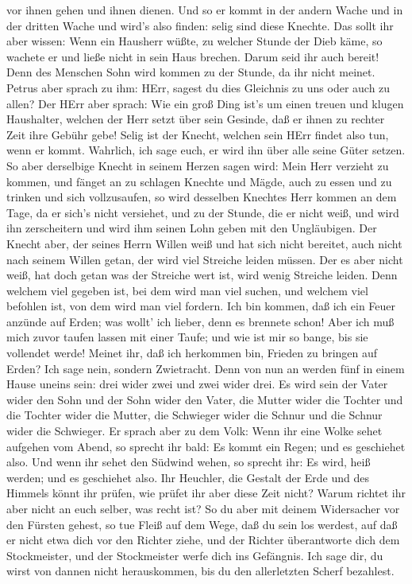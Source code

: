 vor ihnen gehen und ihnen dienen.  Und so er kommt in der
andern Wache und in der dritten Wache und wird's also finden: selig sind
diese Knechte.  Das sollt ihr aber wissen: Wenn ein
Hausherr wüßte, zu welcher Stunde der Dieb käme, so wachete er und ließe
nicht in sein Haus brechen.  Darum seid ihr auch bereit!
Denn des Menschen Sohn wird kommen zu der Stunde, da ihr nicht meinet.
 Petrus aber sprach zu ihm: HErr, sagest du dies Gleichnis
zu uns oder auch zu allen?  Der HErr aber sprach: Wie ein
groß Ding ist's um einen treuen und klugen Haushalter, welchen der Herr
setzt über sein Gesinde, daß er ihnen zu rechter Zeit ihre Gebühr gebe!
 Selig ist der Knecht, welchen sein HErr findet also tun,
wenn er kommt.  Wahrlich, ich sage euch, er wird ihn über
alle seine Güter setzen.  So aber derselbige Knecht in
seinem Herzen sagen wird: Mein Herr verzieht zu kommen, und fänget an zu
schlagen Knechte und Mägde, auch zu essen und zu trinken und sich
vollzusaufen,  so wird desselben Knechtes Herr kommen an
dem Tage, da er sich's nicht versiehet, und zu der Stunde, die er nicht
weiß, und wird ihn zerscheitern und wird ihm seinen Lohn geben mit den
Ungläubigen.  Der Knecht aber, der seines Herrn Willen weiß
und hat sich nicht bereitet, auch nicht nach seinem Willen getan, der
wird viel Streiche leiden müssen.  Der es aber nicht weiß,
hat doch getan was der Streiche wert ist, wird wenig Streiche leiden.
Denn welchem viel gegeben ist, bei dem wird man viel suchen, und welchem
viel befohlen ist, von dem wird man viel fordern.  Ich bin
kommen, daß ich ein Feuer anzünde auf Erden; was wollt' ich lieber, denn
es brennete schon!  Aber ich muß mich zuvor taufen lassen
mit einer Taufe; und wie ist mir so bange, bis sie vollendet werde!
 Meinet ihr, daß ich herkommen bin, Frieden zu bringen auf
Erden? Ich sage nein, sondern Zwietracht.  Denn von nun an
werden fünf in einem Hause uneins sein: drei wider zwei und zwei wider
drei.  Es wird sein der Vater wider den Sohn und der Sohn
wider den Vater, die Mutter wider die Tochter und die Tochter wider die
Mutter, die Schwieger wider die Schnur und die Schnur wider die
Schwieger.  Er sprach aber zu dem Volk: Wenn ihr eine Wolke
sehet aufgehen vom Abend, so sprecht ihr bald: Es kommt ein Regen; und
es geschiehet also.  Und wenn ihr sehet den Südwind wehen,
so sprecht ihr: Es wird, heiß werden; und es geschiehet also.
 Ihr Heuchler, die Gestalt der Erde und des Himmels könnt
ihr prüfen, wie prüfet ihr aber diese Zeit nicht?  Warum
richtet ihr aber nicht an euch selber, was recht ist?  So
du aber mit deinem Widersacher vor den Fürsten gehest, so tue Fleiß auf
dem Wege, daß du sein los werdest, auf daß er nicht etwa dich vor den
Richter ziehe, und der Richter überantworte dich dem Stockmeister, und
der Stockmeister werfe dich ins Gefängnis.  Ich sage dir,
du wirst von dannen nicht herauskommen, bis du den allerletzten Scherf
bezahlest.


